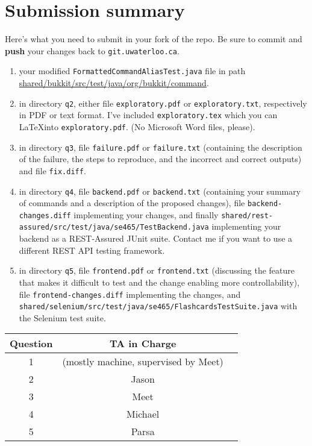 \documentclass[10pt,hidelinks]{article}
\begin{document}
\section*{Submission summary}
Here's what you need to submit in your fork of the repo. Be sure to commit
and {\bf push} your changes back to {\tt git.uwaterloo.ca}.
\begin{enumerate}
\item your modified {\tt FormattedCommandAliasTest.java} file in path
\url{shared/bukkit/src/test/java/org/bukkit/command}.
\item in directory {\tt q2}, either file {\tt exploratory.pdf} or {\tt exploratory.txt}, respectively
in PDF or text format. I've included {\tt exploratory.tex} which you can
\LaTeX into {\tt exploratory.pdf}. (No Microsoft Word files, please).
\item in directory {\tt q3}, file {\tt failure.pdf} or {\tt failure.txt} (containing the description of the failure, the steps to reproduce, and the incorrect and correct outputs) and file {\tt fix.diff}.
\item in directory {\tt q4}, file {\tt backend.pdf} or {\tt backend.txt} (containing your summary of commands and a description of the proposed changes), file {\tt backend-changes.diff} implementing your changes, and finally {\tt shared/rest-assured/src/test/java/se465/TestBackend.java} implementing your backend as a REST-Assured JUnit suite. Contact me if you want to use a different REST API testing framework.
\item in directory {\tt q5}, file {\tt frontend.pdf} or {\tt frontend.txt} (discussing the feature that makes it difficult to test and the change enabling more controllability), file {\tt frontend-changes.diff} implementing the changes, and {\tt shared/selenium/src/test/java/se465/FlashcardsTestSuite.java} with the Selenium test suite.
\end{enumerate}
 
 \begin{center}
 \begin{tabular}{c|cc}
 Question   &  TA in Charge \\ \hline
1 & (mostly machine, supervised by Meet) \\ 
2 & Jason \\ 
3 & Meet \\ 
4 & Michael \\
5 & Parsa
 \end{tabular}
 \end{center}
\end{document}
